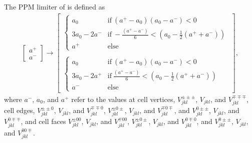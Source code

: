 \documentclass{aastex63}
\begin{document}
The PPM limiter of \cite{COLELLA1984} is defined as
\begin{align}
  \begin{bmatrix}
 	a^+ \\
        a^-
  \end{bmatrix} \rightarrow
  \begin{bmatrix}
 	\begin{cases}
             a_0 &  \mathrm{if} \ \left(a^+ - a_0\right)\left(a_0 - a^-\right) < 0 \\
             3 a_0 - 2 a^- & \mathrm{if}  \ -\frac{\left(a^+ - a^-\right)}{6} < \left(a_0 - \tfrac{1}{2}\left(a^+ + a^-\right)\right) \\
             a^+ &  \mathrm{else}
        \end{cases} \\
\\
         \begin{cases}
             a_0 &  \mathrm{if} \ \left(a^+ - a_0\right)\left(a_0 - a^-\right) < 0 \\
             3 a_0 - 2 a^+ & \mathrm{if} \ \frac{\left(a^+ - a^-\right)}{6} < \left(a_0 - \tfrac{1}{2}\left(a^+ + a^-\right)\right) \\
             a^- &  \mathrm{else}
        \end{cases}
  \end{bmatrix},
\end{align}
where $a^-$, $a_0$, and $a^+$ refer to the values at cell vertices, $V^{\pm\pm\pm}_{j k l}$, $V_{j k l}$, and $V^{\mp\mp\mp}_{j k l}$, cell edges,
$V^{\pm\pm 0}_{j k l}$, $V_{j k l}$, and $V^{\mp\mp 0}_{j k l}$,
$V^{\pm 0 \pm}_{j k l}$, $V_{j k l}$, and $V^{\mp 0 \mp}_{j k l}$,
and
$V^{0 \pm\pm}_{j k l}$, $V_{j k l}$, and $V^{0 \mp\mp}_{j k l}$, 
and cell faces
$V^{\pm 0 0}_{j k l}$, $V_{j k l}$, and $V^{\mp 0 0}_{j k l}$,
$V^{\pm 0 \pm}_{j k l}$, $V_{j k l}$, and $V^{0 \mp 0}_{j k l}$,
and
$V^{0 \pm \pm}_{j k l}$, $V_{j k l}$, and $V^{0 0 \mp}_{j k l}$.
\end{document}
